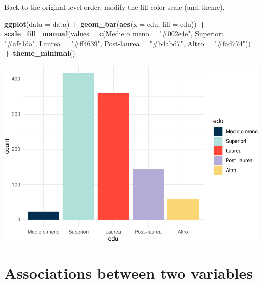 \documentclass[
]{book}
\newenvironment{Shaded}{\begin{snugshade}}{\end{snugshade}}
\newcommand{\AttributeTok}[1]{\textcolor[rgb]{0.13,0.29,0.53}{#1}}
\newcommand{\FunctionTok}[1]{\textcolor[rgb]{0.13,0.29,0.53}{\textbf{#1}}}
\newcommand{\NormalTok}[1]{#1}
\newcommand{\OtherTok}[1]{\textcolor[rgb]{0.56,0.35,0.01}{#1}}
\newcommand{\SpecialCharTok}[1]{\textcolor[rgb]{0.81,0.36,0.00}{\textbf{#1}}}
\newcommand{\StringTok}[1]{\textcolor[rgb]{0.31,0.60,0.02}{#1}}
\begin{document}
Back to the original level order, modify the fill color scale (and theme).

\begin{Shaded}
\begin{Highlighting}[]
\FunctionTok{ggplot}\NormalTok{(}\AttributeTok{data =}\NormalTok{ data) }\SpecialCharTok{+}
  \FunctionTok{geom\_bar}\NormalTok{(}\FunctionTok{aes}\NormalTok{(}\AttributeTok{x =}\NormalTok{ edu, }\AttributeTok{fill =}\NormalTok{ edu)) }\SpecialCharTok{+}
  \FunctionTok{scale\_fill\_manual}\NormalTok{(}\AttributeTok{values =} \FunctionTok{c}\NormalTok{(}\StringTok{\textasciigrave{}}\AttributeTok{Medie o meno}\StringTok{\textasciigrave{}} \OtherTok{=} \StringTok{"\#002e4e"}\NormalTok{, }
                               \AttributeTok{Superiori =} \StringTok{"\#afe1da"}\NormalTok{, }
                               \AttributeTok{Laurea =} \StringTok{"\#ff4639"}\NormalTok{, }
                               \StringTok{\textasciigrave{}}\AttributeTok{Post{-}laurea}\StringTok{\textasciigrave{}} \OtherTok{=} \StringTok{"\#b4abd7"}\NormalTok{, }
                               \AttributeTok{Altro =} \StringTok{"\#fad774"}\NormalTok{)) }\SpecialCharTok{+}
  \FunctionTok{theme\_minimal}\NormalTok{()}
\end{Highlighting}
\end{Shaded}

\includegraphics{R-for-social-research-and-business-analytics_files/figure-latex/unnamed-chunk-28-1.pdf}

\hypertarget{associations-between-two-variables}{%
\section{Associations between two variables}\label{associations-between-two-variables}}
\end{document}
